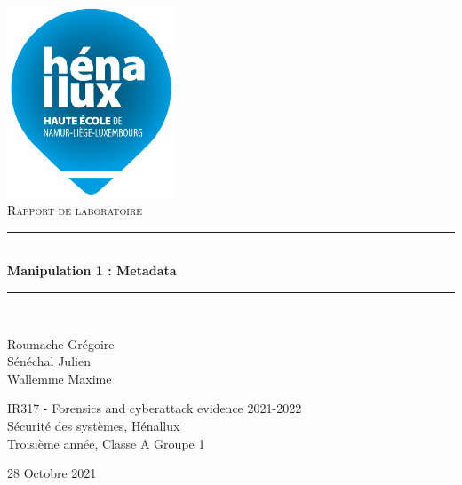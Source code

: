 \documentclass[a4paper]{article}
\newcommand{\HRule}{\rule{\linewidth}{0.5mm}}
\begin{document}
\begin{titlepage}
    \begin{sffamily}
        \begin{center}

            \includegraphics[width=5cm]{images/LogoHenallux.PNG}~\\[1.5cm]
            \textsc{\Large Rapport de laboratoire}\\[1.5cm]

            \HRule \\[0.4cm]
            { \huge \bfseries Manipulation 1 : Metadata\\[0.4cm] }
            \HRule \\[2cm]

            \begin{minipage}{0.4\textwidth}
                \begin{flushleft} \large
                    Roumache Grégoire\\
                    Sénéchal Julien\\
                    Wallemme Maxime\\
                \end{flushleft}
            \end{minipage}
            \begin{minipage}{0.55\textwidth}
                \begin{flushright} \large
                    IR317 - Forensics and cyberattack evidence 2021-2022\\
                    Sécurité des systèmes, Hénallux\\
                    Troisième année, Classe A Groupe 1 \\
                \end{flushright}
            \end{minipage}
            \vfill

            {\large 28 Octobre 2021}

        \end{center}
    \end{sffamily}
\end{titlepage}
\end{document}
